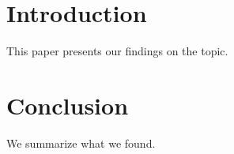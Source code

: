 \documentclass{article}
\begin{document}
\tableofcontent

\section{Introduction}

This paper presents our findings on the topic.

\section{Conclusion}

We summarize what we found.
\end{document}
